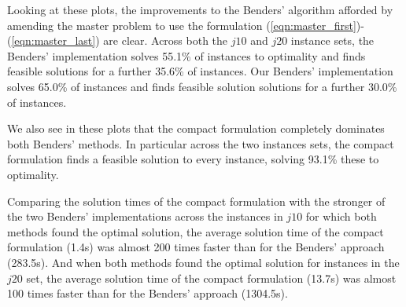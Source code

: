 \documentclass[a4paper,abstracton]{scrartcl}
\begin{document}
Looking at these plots, the improvements to the Benders' algorithm afforded by amending the master problem to use the formulation (\ref{eqn:master_first})-(\ref{eqn:master_last}) are clear. Across both the $j10$ and $j20$ instance sets, the \cite{balouka2021robust} Benders' implementation solves 55.1\% of instances to optimality and finds feasible solutions for a further 35.6\% of instances. Our Benders' implementation solves 65.0\% of instances and finds feasible solution solutions for a further 30.0\% of instances.

We also see in these plots that the compact formulation completely dominates both Benders' methods. In particular across the two instances sets, the compact formulation finds a feasible solution to every instance, solving 93.1\% these to optimality.

Comparing the solution times of the compact formulation with the stronger of the two Benders' implementations across the instances in $j10$ for which both methods found the optimal solution, the average solution time of the compact formulation (1.4s) was almost 200 times faster than for the Benders' approach (283.5s). And when both methods found the optimal solution for instances in the $j20$ set, the average solution time of the compact formulation (13.7s) was almost 100 times faster than for the Benders' approach (1304.5s). 
\end{document}
